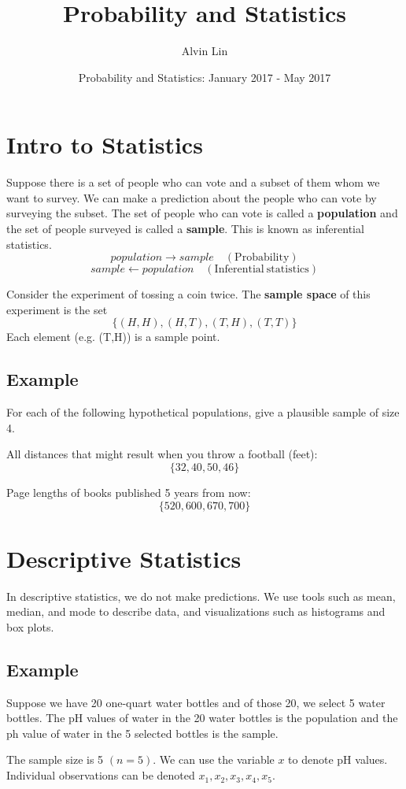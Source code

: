 \documentclass[letterpaper, 12pt]{math}
\title{Probability and Statistics}
\author{Alvin Lin}
\date{Probability and Statistics: January 2017 - May 2017}
\begin{document}
\maketitle

\section*{Intro to Statistics}
Suppose there is a set of people who can vote and a subset of them
whom we want to survey. We can make a prediction about the people
who can vote by surveying the subset. The set of people who can
vote is called a \textbf{population} and the set of people surveyed
is called a \textbf{sample}. This is known as inferential statistics.
\[ population \to sample \quad \mathrm{(Probability)} \]
\[ sample \gets population \quad \mathrm{(Inferential\ statistics)} \]

Consider the experiment of tossing a coin twice. The
\textbf{sample space} of this experiment is the set
\[ \bigg\{ (H,H), (H,T), (T,H), (T,T) \bigg\} \]
Each element (e.g. (T,H)) is a sample point.

\subsection*{Example}
For each of the following hypothetical populations, give a plausible
sample of size 4.

All distances that might result when you throw a football (feet):
\[ \bigg\{ 32, 40, 50, 46 \bigg\} \]

Page lengths of books published 5 years from now:
\[ \bigg\{ 520, 600, 670, 700 \bigg\} \]

\section*{Descriptive Statistics}
In descriptive statistics, we do not make predictions. We use tools such
as mean, median, and mode to describe data, and visualizations such as
histograms and box plots.

\subsection*{Example}
Suppose we have 20 one-quart water bottles and of those 20, we select 5
water bottles. The pH values of water in the 20 water bottles is the
population and the ph value of water in the 5 selected bottles is the sample.

The sample size is 5 \( (n = 5) \). We can use the variable \( x \) to denote
pH values. Individual observations can be denoted \( x_{1}, x_{2}, x_{3}, x_{4},
x_{5} \).
\end{document}
